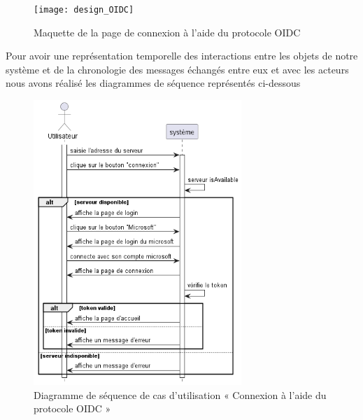\begin{figure}[H]
  \centering
  \texttt{[image: design\_OIDC]}
  \caption{Maquette de la page de connexion à l’aide du protocole OIDC}
  \label{fig:design_OIDC}
\end{figure}


Pour avoir une représentation temporelle des interactions entre les objets de notre système et de la chronologie des messages échangés entre eux et avec les acteurs nous avons réalisé les diagrammes de séquence représentés ci-dessous

\begin{figure}[H]
  \centering
  \includegraphics[width=0.7\textwidth]{out/diagrams/sprint5/auth_OIDC/auth_OIDC}
  \caption{Diagramme de séquence de cas d'utilisation « Connexion à l’aide du protocole OIDC »}
  \label{fig:sequence_auth_OIDC}
\end{figure}


